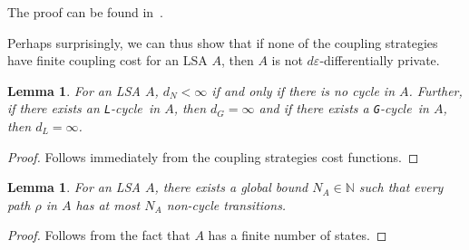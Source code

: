 \documentclass[12pt]{article}
\newcommand{\NN}{\mathbb{N}}
\newcommand{\gcycle}{\texttt{G}-cycle}
\newcommand{\lcycle}{\texttt{L}-cycle}
\newtheorem{lemma}[thm]{Lemma}
\theoremstyle{definition}
\begin{document}
The proof can be found in~\cite{chadhaLinearTimeDecidability2021}.

Perhaps surprisingly, we can thus show that if none of the coupling strategies have finite coupling cost for an LSA $A$, then $A$ is not $d\varepsilon$-differentially private. 

\begin{lemma}
    For an LSA $A$, $d_N < \infty$ if and only if there is no cycle in $A$. Further, if there exists an \lcycle~in $A$, then $d_G = \infty$ and if there exists a \gcycle~in $A$, then $d_L = \infty$. 
\end{lemma}
\begin{proof}
    Follows immediately from the coupling strategies cost functions. 
\end{proof}

\begin{lemma}
    For an LSA $A$, there exists a global bound $N_A\in \NN$ such that every path $\rho$ in $A$ has at most $N_A$ non-cycle transitions. 
\end{lemma}
\begin{proof}
    Follows from the fact that $A$ has a finite number of states. 
\end{proof}
\end{document}
